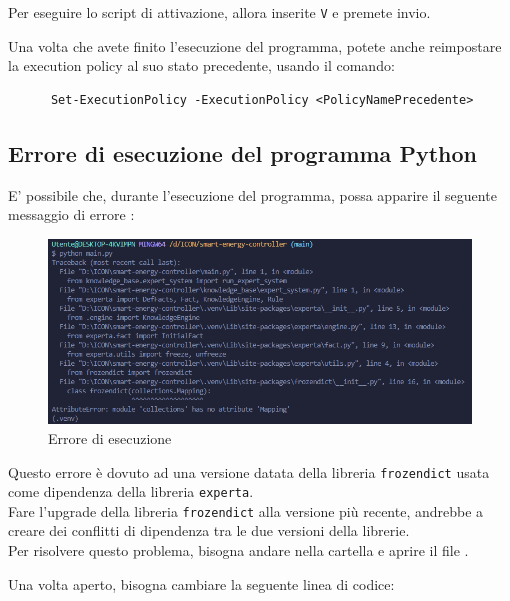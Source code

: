 \documentclass[12pt, letterpaper]{article}
\begin{document}
Per eseguire lo script di attivazione, allora inserite \texttt{V} e
premete invio. \\ \break

\noindent Una volta che avete finito l'esecuzione del programma, potete anche reimpostare
la execution policy al suo stato precedente, usando il comando:

\begin{verbatim}
      Set-ExecutionPolicy -ExecutionPolicy <PolicyNamePrecedente>
\end{verbatim}


\subsection{Errore di esecuzione del programma Python}
\label{sec:python-error}

E' possibile che, durante l'esecuzione del programma, possa apparire il seguente
messaggio di errore \cite{python-mapping-problem}:

\begin{figure}[h]
      \centering
      \includegraphics[scale=0.55]{errore-python.png}
      \caption{Errore di esecuzione}
\end{figure}

\noindent Questo errore è dovuto ad una versione datata della libreria \texttt{frozendict}
usata come dipendenza della libreria \texttt{experta}. \\

\noindent Fare l'upgrade della libreria \texttt{frozendict} alla versione più recente, andrebbe a
creare dei conflitti di dipendenza tra le due versioni della librerie. \\

\noindent Per risolvere questo problema, bisogna andare nella cartella
 e aprire il file .

\noindent Una volta aperto, bisogna cambiare la seguente linea di codice: \\
\end{document}
